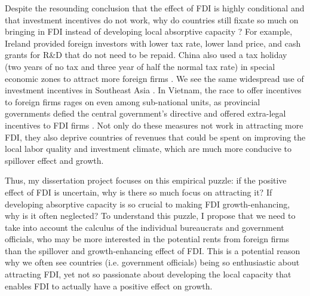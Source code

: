 \documentclass[12pt]{article}
\begin{document}
Despite the resounding conclusion that the effect of FDI is highly conditional and that investment incentives do not work, why do countries still fixate so much on bringing in FDI instead of developing local absorptive capacity \citep{Blomstrom2002}? For example, Ireland provided foreign investors with lower tax rate, lower land price, and cash grants for R\&D that do not need to be repaid. China also used a tax holiday (two years of no tax and three year of half the normal tax rate) in special economic zones to attract more foreign firms \citep{Telford2001}. We see the same widespread use of investment incentives in Southeast Asia \citep{Fletcher2002}. In Vietnam, the race to offer incentives to foreign firms rages on even among sub-national units, as provincial governments defied the central government's directive and offered extra-legal incentives to FDI firms \citep{Vu2007}. Not only do these measures not work in attracting more FDI, they also deprive countries of revenues that could be spent on improving the local labor quality and investment climate, which are much more conducive to spillover effect and growth.

Thus, my dissertation project focuses on this empirical puzzle: if the positive effect of FDI is uncertain, why is there so much focus on attracting it? If developing absorptive capacity is so crucial to making FDI growth-enhancing, why is it often neglected? To understand this puzzle, I propose that we need to take into account the calculus of the individual bureaucrats and government officials, who may be more interested in the potential rents from foreign firms than the spillover and growth-enhancing effect of FDI. This is a potential reason why we often see countries (i.e. government officials) being so enthusiastic about attracting FDI, yet not so passionate about developing the local capacity that enables FDI to actually have a positive effect on growth.
\end{document}
